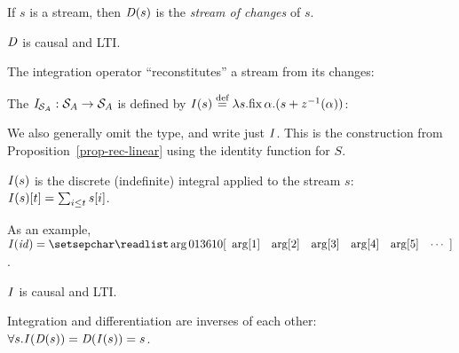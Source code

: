 If $s$ is a stream, then $\mathit{D}(s)$ is the \emph{stream of changes} of $s$. 

\begin{proposition}
\label{prop-diff-properties}
$\mathit{D}$ is causal and LTI.
\end{proposition}

The integration operator ``reconstitutes'' a stream from its changes:

\begin{definition}[Integration]
The   $\mathit{I}_{\mathcal{S}_{A}} : \mathcal{S}_{A} \to \mathcal{S}_{A}$ 
is defined by $\mathit{I}(s) \stackrel{\textrm{\scriptsize def}}{=} \lambda s . \mbox{fix}\,\alpha.(s + z^{-1}(\alpha))$:
\begin{center}
\end{center}
\end{definition}

\noindent
We also generally omit the type, and write just $\mathit{I}$.
This is the construction from Proposition~\ref{prop-rec-linear} 
using the identity function for $S$.

\begin{proposition}
$\mathit{I}(s)$ is the discrete (indefinite) integral applied to the stream $s$: 
$\mathit{I}(s)[t] = \sum_{i \leq t} s[i]$.
\end{proposition}
\ifstreamexamples
As an example, $\I(\id) = \sv{0 1 3 6 10}$.
\fi

\begin{proposition}
\label{prop-integ-properties}
$\mathit{I}$ is causal and LTI.
\end{proposition}

\begin{theorem}[Inversion]
\label{inverses}
Integration and differentiation are inverses of each other:
$\forall s . \mathit{I}(\mathit{D}(s)) = \mathit{D}(\mathit{I}(s)) = s$.
\end{theorem}

